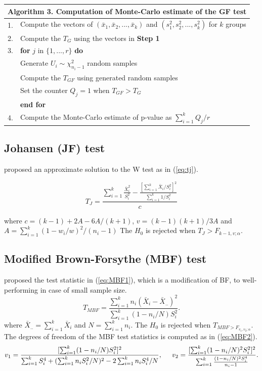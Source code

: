 \begin{table}[h]
\centering
\begin{tabular}{ll}\midrule
\multicolumn{2}{l}{\textbf{Algorithm 3.} Computation of Monte-Carlo estimate of the GF test}\\\midrule
1.&Compute the vectors of $(\bar{x}_1, \bar{x}_2, ..., \bar{x}_k)$ and $(s_1^2, s_2^2, ..., s_k^2)$ for $k$ groups\\
2.&Compute the $T_G$ using the vectors in \textbf{Step 1}\\
3.&\textbf{for} $j$ in $\{1, ..., r\}$ \textbf{do}\\
   &Generate $U_i \sim \chi^2_{n_i-1}$ random samples\\
   &Compute the $T_{GF}$ using generated random samples\\
   &Set the counter $Q_j=1$ when $T_{GF}>T_G$\\
   &\textbf{end for}\\
4.&Compute the Monte-Carlo estimate of p-value as $\sum_{i=1}^k Q_j/r$\\\midrule
\end{tabular}
\end{table}
\subsection{Johansen (JF) test}

\cite{johansen:1980} proposed an approximate solution to the W test as in (\ref{eq:tj}).

\begin{equation}
T_J=\frac{\sum_{i=1}^k \frac{\bar{X}_i^2}{S_i^2}-\frac{[\sum_{i=1}^k\bar{X}_i/S_i^2]^2}{\sum_{i=1}^k 1/S_i^2} }{c}
\label{eq:tj}
\end{equation}

\noindent where $c=(k-1)+2A-6A/(k+1)$, $v=(k-1)(k+1)/3A$ and $A=\sum_{i=1}^k (1-w_i/w)^2/(n_i-1)$ The $H_0$ is rejected when $T_J > F_{k-1, v; \alpha}$.

\subsection{Modified Brown-Forsythe (MBF) test}

\cite{mehrotra:1997} proposed the test statistic in (\ref{eq:MBF1}), which is a modification of BF, to well-performing in case of small sample size. 
\begin{equation}
T_{MBF}=\frac{\sum_{i=1}^k n_i(\bar{X}_i-\bar{X}_{..})^2}{\sum_{i=1}^k (1-n_i/N)S_i^2} \label{eq:MBF1}.
\end{equation}
where $\bar{X}_{..}=\sum_{i=1}^k \bar{X}_i$ and $N=\sum_{i=1}^k n_i$. The $H_0$ is rejected when $T_{MBF>F_{v_1, v_2; \alpha}}$. The degrees of freedom of the MBF test statistics is computed as in (\ref{eq:MBF2}).
\begin{equation}
v_1=\frac{[\sum_{i=1}^k (1-n_i/N)S_i^2]^2}{\sum_{i=1}^k S_i^4+(\sum_{i=1}^k n_iS_i^2/N)^2-2\sum_{i=1}^k n_iS_i^4/N}
, \hspace{5mm}    v_2=\frac{[\sum_{i=1}^k (1-n_i/N)^2 S_i^2]^2}{\sum_{i=1}^k \frac{(1-n_i/N)^2S_i^4}{n_i-1}} \label{eq:MBF2}.
\end{equation}
